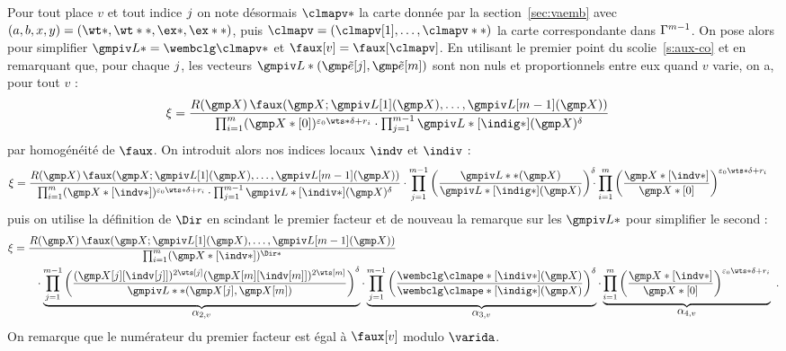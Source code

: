 Pour tout place \( v \) et tout indice \( j \) on note désormais
\( \clmapv* \) la carte donnée par la section~\vref{sec:vaemb} avec \( (a, b,
  x, y) = (\wt*, \wt**, \ex*, \ex**) \), puis \( \clmapv = (\clmapv[1], \dots,
  \clmapv**) \) la carte correspondante dans \( \Gamma^{m-1} \).  On
pose alors pour simplifier \( \wembclv* = \wembclg\clmapv* \) et \( \fauxv =
  \faux[\clmapv] \).  En utilisant le premier point du scolie~\vref{s:aux-co}
et en remarquant que, pour chaque \( j \), les vecteurs \( \wembclv*
  (\cexa[\fcti], \cexa[m]) \) sont non nuls et proportionnels entre eux
quand \( v \) varie, on a, pour tout \( v \) :
\begin{align}
  \ratf
  & =
  \frac{
    R(\vmp) \,
    \faux( \vmp; \wembclv[1](\vmp), \dots, \wembclv[m-1](\vmp) )
  }{
    \prod\fctrange
    (\vmp*[0])^{\epsz \wts* \delta + r_\fct}
    \cdot
    \prod\fctirange
    \wembclv*[\indig*](\vmp) ^{ \delta }
  }
\end{align}
par homogénéité de \( \faux \). On introduit alors nos indices locaux \( \indv
\) et \( \indiv \) :
\begin{align}
  \ratf
   & =
  \frac{
    R(\vmp) \,
    \faux( \vmp; \wembclv[1](\vmp), \dots, \wembclv[m-1](\vmp) )
  }{
    \prod\fctrange
    (\vmp*[\indv*])^{\epsz \wts* \delta + r_\fct}
    \cdot
    \prod\fctirange
    \wembclv*[\indiv*](\vmp) ^{ \delta }
  }
  \cdot \prod\fctirange
  \left(
    \frac{ \wembclv**(\vmp) }{ \wembclv*[\indig*](\vmp) }
  \right) ^{ \delta }
  \!\!\! \cdot \prod\fctrange
  \left(
    \frac{ \vmp*[\indv*] }{ \vmp*[0] }
  \right) ^{ \epsz \wts* \delta + r_\fct }
\end{align}
puis on utilise la définition de \( \Dir \) en scindant le premier facteur et
de nouveau la remarque sur les \( \wembclv* \) pour simplifier le second :
\begin{align}
  \ratf
  & =
  \frac{
    R(\vmp) \,
    \faux( \vmp; \wembclv[1](\vmp), \dots, \wembclv[m-1](\vmp) )
  }{
    \prod\fctrange (\vmp*[\indv*]) ^{ \Dir* }
  }
  \\ & \qquad
  \cdot \underbrace{
    \prod\fctirange \left(
      \frac{
        ( \vmp[\fcti ][{\indv[\fcti ]}] )^{ 2\wts[\fcti ] }
        ( \vmp[m][{\indv[m]}] )^{ 2\wts[m] }
      }{
        \wembclv**(\vmp[\fcti], \vmp[m])
      }
    \right)^\delta
  }_{\textstyle \ratfv2}
  \cdot \underbrace{
    \prod\fctirange \left(
      \frac{
        \wembclg\clmape*[\indiv*](\vmp) }{
        \wembclg\clmape*[\indig*](\vmp) }
    \right) ^{ \delta }
  }_{\textstyle \ratfv3}
  \cdot \underbrace{
    \prod\fctrange \left(
      \frac{ \vmp*[\indv*] }{ \vmp*[0] }
    \right) ^{ \epsz \wts* \delta + r_\fct }
  }_{\textstyle \ratfv4}
  \pmm.
\end{align}
On remarque que le numérateur du premier facteur est égal à \( \fauxv \)
modulo \( \varida \).

